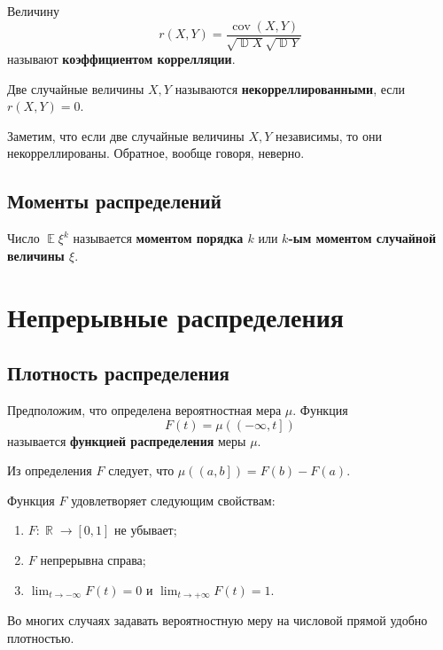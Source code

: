 \documentclass[12pt]{article}
\DeclareMathOperator{\mexp}{\mathbb{E}}
\DeclareMathOperator{\var}{\mathbb{D}}
\DeclareMathOperator{\RR}{\mathbb{R}}
\DeclareMathOperator{\cov}{cov}
\begin{document}
    Величину
    \begin{equation*}
        r(X, Y) = \frac{\cov(X, Y)}{\sqrt{\var X}\sqrt{\var Y}}
    \end{equation*}
    называют \textbf{коэффициентом коррелляции}.

    Две случайные величины $X,Y$ называются \textbf{некорреллированными}, если $r(X, Y) = 0$. 

    Заметим, что если две случайные величины $X, Y$ независимы, то они некорреллированы. Обратное, вообще говоря, неверно.

    \subsection{Моменты распределений}
    Число $\mexp \xi^k$ называется \textbf{моментом порядка $k$} или \textbf{$k$-ым моментом случайной величины $\xi$}. 

    \section{Непрерывные распределения}
    \subsection{Плотность распределения}
    Предположим, что определена вероятностная мера $\mu$. Функция
    \begin{equation*}
        F(t) = \mu(\left(-\infty, t\right])
    \end{equation*}
    называется \textbf{функцией распределения} меры $\mu$.

    Из определения $F$ следует, что $\mu(\left(a, b\right]) = F(b) - F(a)$.

    Функция $F$ удовлетворяет следующим свойствам: 
    \begin{enumerate}[label=(\roman*)]
        \item $F: \RR \to \left[0, 1\right]$ не убывает;
        \item $F$ непрерывна справа;
        \item $\lim_{t \to -\infty} F(t) = 0$ и $\lim_{t \to +\infty} F(t) = 1$.
    \end{enumerate}

    Во многих случаях задавать вероятностную меру на числовой прямой удобно плотностью.
\end{document}
